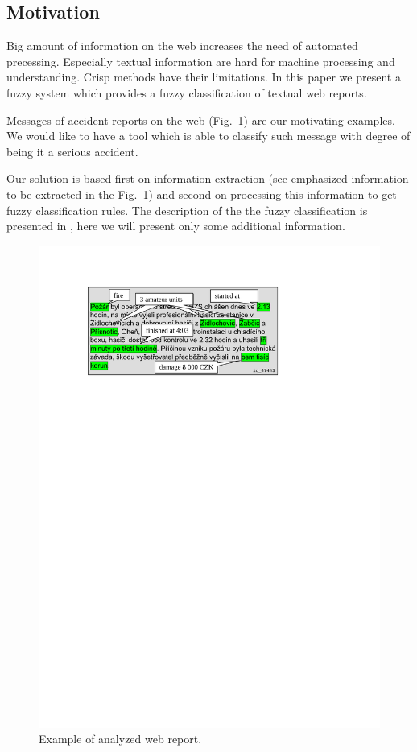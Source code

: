 \begin{multicols}{2}
\subsection{Motivation}
Big amount of information on the web increases the need of automated precessing. Especially textual information are hard for machine processing and understanding. Crisp methods have their limitations. In this paper we present a fuzzy system which provides a fuzzy classification of textual web reports. 

Messages of accident reports on the web (Fig.~\ref{dedek:message}) are our motivating examples. We would like to have a tool which is able to classify such message with degree of being it a serious accident. 

Our solution is based first on information extraction (see emphasized information to be extracted in the Fig.~\ref{dedek:message}) and second on processing this information to get fuzzy classification rules. The description of the the fuzzy classification is presented in \cite{Dedek:FuzzWI}, here we will present only some additional information.

\begin{figure}
\medskip
\centerline{\includegraphics[width=\hsize]{img/message}}
\caption{Example of analyzed web report.}
\label{dedek:message}
\end{figure}



\end{multicols}
